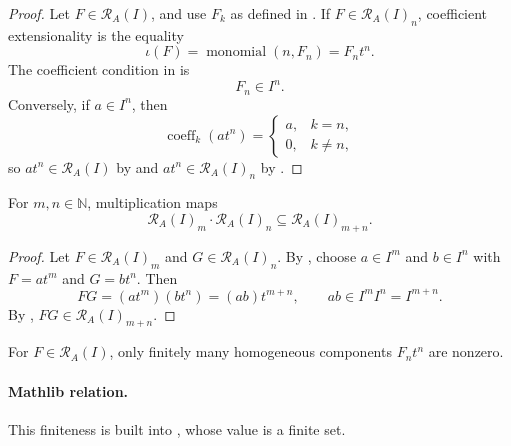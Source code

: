 \begin{proof}
  \leanok
  Let $F\in\mathcal R_A(I)$, and use $F_k$ as defined in
  .  If
  $F\in\mathcal R_A(I)_n$, coefficient extensionality is the equality
  \[
    \iota(F)=\operatorname{monomial}(n,F_n)=F_nt^n.
  \]
  The coefficient condition in  is
  \[
    F_n\in I^n.
  \]
  Conversely, if $a\in I^n$, then
  \[
    \operatorname{coeff}_k(at^n)
      =\begin{cases}a,&k=n,\\0,&k\ne n,
        \end{cases}
  \]
  so $at^n\in\mathcal R_A(I)$ by
   and
  $at^n\in\mathcal R_A(I)_n$ by .
\end{proof}

\begin{lemma}
  \label{lemma:nagata-rees-piece-mul}
  \leanok

  For $m,n\in\mathbb N$, multiplication maps
  \[
    \mathcal R_A(I)_m\cdot\mathcal R_A(I)_n
      \subseteq\mathcal R_A(I)_{m+n}.
  \]
\end{lemma}

\begin{proof}
  \leanok
  Let $F\in\mathcal R_A(I)_m$ and
  $G\in\mathcal R_A(I)_n$.  By
  , choose
  $a\in I^m$ and $b\in I^n$ with $F=at^m$ and $G=bt^n$.  Then
  \[
    FG=(at^m)(bt^n)=(ab)t^{m+n},
    \qquad ab\in I^mI^n=I^{m+n}.
  \]
  By ,
  $FG\in\mathcal R_A(I)_{m+n}$.
\end{proof}

\begin{lemma}
  \label{lemma:nagata-rees-component-finite-support}
  \leanok

  For $F\in\mathcal R_A(I)$, only finitely many homogeneous components
  $F_nt^n$ are nonzero.

  \paragraph{Mathlib relation.}
  This finiteness is built into
  \texttt{}, whose value is a finite set.
\end{lemma}

